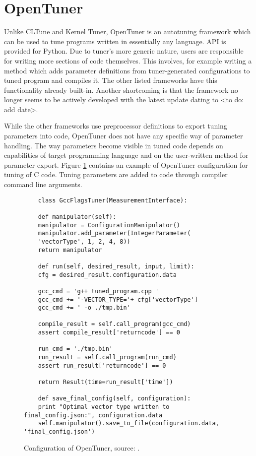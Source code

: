 \documentclass
[
    digital, %
    oneside, %
    table, %
    nolof, %
    nolot, %
    nocover %
]{fithesis3}
\begin{document}
\section{OpenTuner}
Unlike CLTune and Kernel Tuner, OpenTuner \cite{opentuner} is an autotuning framework which can be used to tune programs written in essentially any
language. API is provided for Python. Due to tuner's more generic nature, users are responsible for writing more sections of code themselves. This
involves, for example writing a method which adds parameter definitions from tuner-generated configurations to tuned program and compiles it. The
other listed frameworks have this functionality already built-in. Another shortcoming is that the framework no longer seems to be actively developed
with the latest update dating to <to do: add date>.

While the other frameworks use preprocessor definitions to export tuning parameters into code, OpenTuner does not have any specific way of parameter
handling. The way parameters become visible in tuned code depends on capabilities of target programming language and on the user-written method for
parameter export. Figure \ref{opentuner-example} contains an example of OpenTuner configuration for tuning of C code. Tuning parameters are added
to code through compiler command line arguments.

\begin{figure}
    \begin{lstlisting}
    class GccFlagsTuner(MeasurementInterface):
    
    def manipulator(self):
    manipulator = ConfigurationManipulator()
    manipulator.add_parameter(IntegerParameter(
    'vectorType', 1, 2, 4, 8))
    return manipulator
    
    def run(self, desired_result, input, limit):
    cfg = desired_result.configuration.data
    
    gcc_cmd = 'g++ tuned_program.cpp '
    gcc_cmd += '-VECTOR_TYPE='+ cfg['vectorType']
    gcc_cmd += ' -o ./tmp.bin'
    
    compile_result = self.call_program(gcc_cmd)
    assert compile_result['returncode'] == 0
    
    run_cmd = './tmp.bin'
    run_result = self.call_program(run_cmd)
    assert run_result['returncode'] == 0
    
    return Result(time=run_result['time'])
    
    def save_final_config(self, configuration):
    print "Optimal vector type written to final_config.json:", configuration.data
    self.manipulator().save_to_file(configuration.data, 'final_config.json')
    \end{lstlisting}
    \caption{Configuration of OpenTuner, source: \cite{opentuner}.}
    \label{opentuner-example}
\end{figure}
\end{document}
